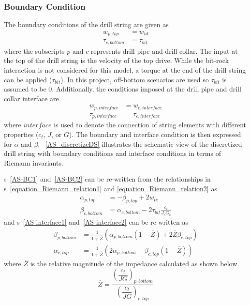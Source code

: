 \subsubsection{Boundary Condition}
The boundary conditions of the drill string are given as
\begin{align}
  w_{p,top} &= w_{td} \label{AS-BC1} \\
  \tau_{c,bottom} &= \tau_{bit} \label{AS-BC2}
\end{align}
where the subscripts $p$ and $c$ represents drill pipe and drill collar.  The input at the top of the drill string is the velocity of the top drive.  While the bit-rock interaction is not considered for this model, a torque at the end of the drill string can be applied ($\tau_{bit}$). In this project, off-bottom scenarios are used so $\tau_{bit}$ is assumed to be 0. Additionally, the conditions imposed at the drill pipe and drill collar interface are
\begin{align}
  w_{p,interface} &= w_{c,interface} \label{AS-interface1} \\
  \tau_{p,interface} &= \tau_{c,interface} \label{AS-interface2}
\end{align}
where $interface$ is used to denote the connection of string elements with different properties ($c_t$, $J$, or $G$). The boundary and interface condition is then expressed for $\alpha$ and $\beta$. \figurename~\ref{AS_discretizeDS} illustrates the schematic view of the discretized drill string with boundary conditions and interface conditions in terms of Riemann invariants.

\equationname{}s~\ref{AS-BC1} and~\ref{AS-BC2} can be re-written from the relationships in \equationname{}s~\ref{equation_Riemann_relation1} and \ref{equation_Riemann_relation2} as
\begin{align}
  \alpha_{p,top} &= -\beta_{p,top} + 2w_{te} \label{AS-riemannBC1} \\
  \beta_{c,bottom} &= \alpha_{c,bottom} - 2\tau_{bit} \frac{c_t}{J_c G_c} \label{AS-riemannBC2}
\end{align}
and \equationname{}s~\ref{AS-interface1} and~\ref{AS-interface2} can be re-written as
\begin{align}\label{AS-riemanninterface}
	\beta_{p,bottom} &= \frac{1}{1+\overline{Z}}\left(\alpha_{p,bottom}(1-\overline{Z}) + 2\overline{Z}\beta_{c,top} \right) \\
	\alpha_{c,top} &= \frac{1}{1+\overline{Z}}\left(2\alpha_{p,bottom} - \beta_{c,top}(1-\overline{Z})\right)
\end{align}
where $\overline{Z}$ is the relative magnitude of the impedance calculated as shown below.
\begin{equation}\label{AS_Zbar}
  \overline{Z} = \dfrac{\left(\dfrac{c_t}{JG}\right)_{p,bottom}}{\left(\dfrac{c_t}{JG}\right)_{c,top}}
\end{equation}

